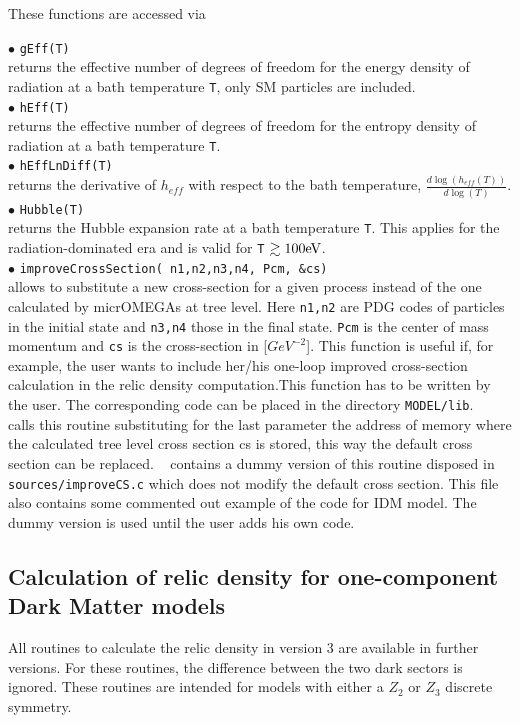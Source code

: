 \documentclass[12pt,a4paper]{article}
\begin{document}
These functions are accessed via

\noindent$\bullet$ \verb|gEff(T)|\\
 returns the effective number of degrees of freedom for the energy density of radiation at a bath temperature \verb|T|,   only SM particles are included.\\
\noindent$\bullet$ \verb|hEff(T)|\\ returns the effective number of degrees of freedom for the entropy density of radiation at a bath temperature \verb|T|.\\
\noindent$\bullet$ \verb|hEffLnDiff(T)|\\ returns the derivative of $h_{eff}$ with respect to the bath temperature, $\frac{d\log(h_{eff}(T))}{d\log(T)}$.\\
\noindent$\bullet$ \verb|Hubble(T)|\\ returns the Hubble expansion rate at a bath temperature \verb|T|. This applies for the radiation-dominated era and is valid for \verb|T| $\gtrsim 100 {\rm eV}$. \\
%
\noindent$\bullet$ \verb|improveCrossSection( n1,n2,n3,n4, Pcm, &cs)|\\
allows to substitute a new cross-section for a given process instead of the one calculated by
micrOMEGAs at tree level.  Here \verb|n1,n2| are PDG codes  of particles in the initial state and
\verb|n3,n4| those in the final state. \verb|Pcm| is the center of mass momentum and \verb|cs| is the cross-section in
[$GeV^{-2}$]. This function is useful if, for example, the user wants to include her/his one-loop improved cross-section 
calculation in the relic density computation.This function has to be written by the user. 
The corresponding code can be placed in the directory \verb|MODEL/lib|. \micro~   calls this routine substituting
for the last parameter the address of memory where the calculated tree level cross section cs is stored, this way the default cross section can be replaced.
 \micro~  contains  a dummy version of this routine  disposed in 
\verb|sources/improveCS.c| which does not modify the default  cross section. This file also  contains
some commented out example of the code for IDM model. The dummy version is used until the user adds his own code. 


\subsection{Calculation of relic density for one-component Dark Matter models}
\label{sec:one_component}
All routines to calculate the relic density in  version 3 are  available in further versions. For these routines,  the difference between 
the two dark sectors is ignored. These routines are intended for models with either a $Z_2$ or $Z_3$ discrete symmetry.
  
\end{document}
